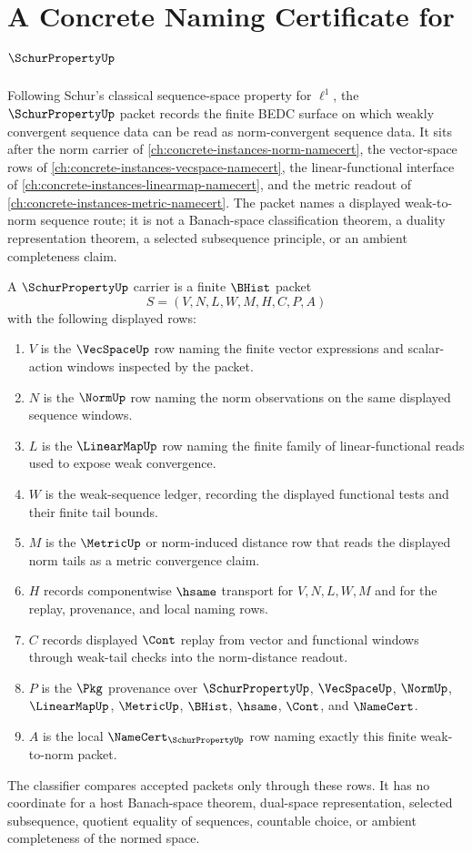 \chapter{A Concrete Naming Certificate for $\SchurPropertyUp$}
\label{ch:concrete-instances-schur-property-namecert}

Following Schur's classical sequence-space property for $\ell^1$, the $\SchurPropertyUp$ packet records the finite BEDC surface on which weakly convergent sequence data can be read as norm-convergent sequence data. It sits after the norm carrier of \autoref{ch:concrete-instances-norm-namecert}, the vector-space rows of \autoref{ch:concrete-instances-vecspace-namecert}, the linear-functional interface of \autoref{ch:concrete-instances-linearmap-namecert}, and the metric readout of \autoref{ch:concrete-instances-metric-namecert}. The packet names a displayed weak-to-norm sequence route; it is not a Banach-space classification theorem, a duality representation theorem, a selected subsequence principle, or an ambient completeness claim.

\begin{definition}
\label{def:schur-property-carrier}
A $\SchurPropertyUp$ carrier is a finite $\BHist$ packet
$$
S=(V,N,L,W,M,H,C,P,A)
$$
with the following displayed rows:
\begin{enumerate}
\item $V$ is the $\VecSpaceUp$ row naming the finite vector expressions and scalar-action windows inspected by the packet.
\item $N$ is the $\NormUp$ row naming the norm observations on the same displayed sequence windows.
\item $L$ is the $\LinearMapUp$ row naming the finite family of linear-functional reads used to expose weak convergence.
\item $W$ is the weak-sequence ledger, recording the displayed functional tests and their finite tail bounds.
\item $M$ is the $\MetricUp$ or norm-induced distance row that reads the displayed norm tails as a metric convergence claim.
\item $H$ records componentwise $\hsame$ transport for $V,N,L,W,M$ and for the replay, provenance, and local naming rows.
\item $C$ records displayed $\Cont$ replay from vector and functional windows through weak-tail checks into the norm-distance readout.
\item $P$ is the $\Pkg$ provenance over $\SchurPropertyUp$, $\VecSpaceUp$, $\NormUp$, $\LinearMapUp$, $\MetricUp$, $\BHist$, $\hsame$, $\Cont$, and $\NameCert$.
\item $A$ is the local $\NameCert_{\SchurPropertyUp}$ row naming exactly this finite weak-to-norm packet.
\end{enumerate}
The classifier compares accepted packets only through these rows. It has no coordinate for a host Banach-space theorem, dual-space representation, selected subsequence, quotient equality of sequences, countable choice, or ambient completeness of the normed space.
\end{definition}

